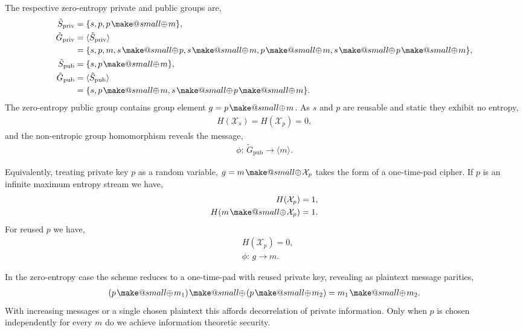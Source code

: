 \documentclass[twocolumn, aps, amsmath, amssymb, nofootinbib, superscriptaddress, longbibliography, doublefloatfix, table-of-contents, eqsecnum, rmp]{revtex4-2}
\makeatletter
\newcommand{\soplus}{{{\hspace{1pt}}{\mathbin{\mathpalette\make@small{\mathbin\oplus}}}}{\hspace{1pt}}}
\newcommand{\make@small}[2]{%
  \vcenter{\hbox{%
    \scalebox{0.6}{$\m@th#1#2$}%
  }}%
}
\makeatother
\begin{document}

The respective zero-entropy private and public groups are,
\begin{align}
	{\tilde S}_\mathrm{priv} &= \{s, p, p \soplus m\},\nonumber\\
	{\tilde G}_\mathrm{priv} &= \langle {\tilde S}_\mathrm{priv} \rangle \nonumber\\
	&= \{s, p, m, s\soplus p, s\soplus m, p\soplus m, s\soplus p\soplus m\},\nonumber\\
	{\tilde S}_\mathrm{pub} &= \{s, p \soplus m\},\nonumber\\
	{\tilde G}_\mathrm{pub} &= \langle {\tilde S}_\mathrm{pub} \rangle \nonumber\\
	&= \{s, p\soplus m, s\soplus p\soplus m\}.
\end{align}
The zero-entropy public group contains group element $g=p\soplus m$. As $s$ and $p$ are reusable and static they exhibit no entropy,
\begin{align}
	H(\mathcal{X}_s)=H(\mathcal{X}_p)=0,	
\end{align}
and the non-entropic group homomorphism reveals the message,
\begin{align}
	\phi:\, \tilde{G}_\mathrm{pub} \to \langle m\rangle.
\end{align}

Equivalently, treating private key $p$ as a random variable, $g=m\soplus \mathcal{X}_p$ takes the form of a one-time-pad cipher. If $p$ is an infinite maximum entropy stream we have,
\begin{align}
	H(\mathcal{X}_p) &= 1,\nonumber\\
	H(m\soplus \mathcal{X}_p) &= 1.
\end{align}
For reused $p$ we have,
\begin{align}
	&H(\mathcal{X}_p) = 0,\nonumber\\
	&\phi: \,g\to m.
\end{align}

In the zero-entropy case the scheme reduces to a one-time-pad with reused private key, revealing as plaintext message parities,
\begin{align}
	(p\soplus m_1) \soplus (p \soplus m_2) = m_1 \soplus m_2.
\end{align}
With increasing messages or a single chosen plaintext this affords decorrelation of private information. Only when $p$ is chosen independently for every $m$ do we achieve information theoretic security.
\end{document}
